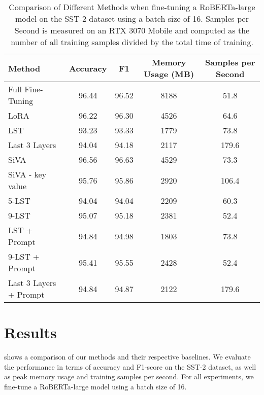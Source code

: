 
\begin{table*}[htb]
  \caption{Comparison of Different Methods when fine-tuning a RoBERTa-large model on the SST-2 dataset using a batch size of 16. Samples per Second is measured on an RTX 3070 Mobile and computed as the number of all training samples divided by the total time of training.}
  \label{method-comparison}
  \centering
  \begin{tabular}{lcccc}
    \toprule
    Method           & Accuracy & F1    & Memory Usage (MB) & Samples per Second    \\
    \midrule
    Full Fine-Tuning & 96.44    & 96.52 & 8188              & 51.8                  \\
    LoRA             & 96.22    & 96.30 & 4526              & 64.6                  \\
    LST              & 93.23    & 93.33 & 1779              & 73.8                  \\
    Last 3 Layers    & 94.04    & 94.18 & 2117              & 179.6                     \\
    \midrule
    SiVA             & 96.56    & 96.63 & 4529              & 73.3                  \\
    SiVA - key value & 95.76    & 95.86 & 2920              & 106.4                 \\
    \midrule
    5-LST            & 94.04    & 94.04 & 2209              & 60.3                  \\
    9-LST            & 95.07    & 95.18 & 2381              & 52.4                  \\
    \midrule
    LST + Prompt  & 94.84    & 94.98 & 1803              & 73.8                  \\
    9-LST + Prompt& 95.41    & 95.55 & 2428              & 52.4                  \\
    Last 3 Layers + Prompt & 94.84 & 94.87 & 2122 & 179.6 \\
    \bottomrule
  \end{tabular}
\end{table*}

\section{Results}

 shows a comparison of our methods and their respective baselines. We evaluate the performance in terms of accuracy and F1-score on the SST-2 dataset, as well
as peak memory usage and training samples per second. For all experiments, we fine-tune a RoBERTa-large model using a batch size of 16. 

